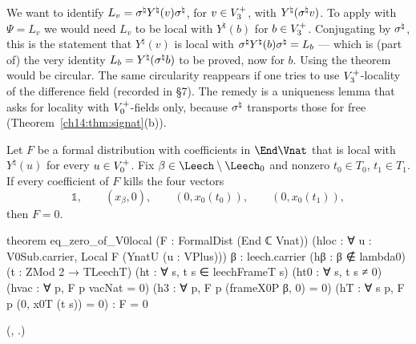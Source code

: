 \begin{warning}[title={Trap / dead end: The circularity of \lean{YnatT_eq_of_creates} in this context}]
We want to identify $L_v=\sigma^{\natural} Y^\natural(v)\sigma^{\natural}$, for $v\in V_3^{+}$, with
$Y^\natural(\sigma^{\natural} v)$.  To apply  with $\Psi=L_v$ we would need $L_v$ to be
local with $Y^\natural(b)$ for $b\in V_3^{+}$.  Conjugating by $\sigma^{\natural}$, this is the statement that
$Y^\natural(v)$ is local with $\sigma^{\natural} Y^\natural(b)\sigma^{\natural}=L_b$ — which is (part of) the very
identity $L_b=Y^\natural(\sigma^{\natural} b)$ to be proved, now for $b$.  Using the theorem would be circular.
The same circularity reappears if one tries to use $V_3^{+}$-locality of the difference field
(recorded in  \S7).  The remedy is a uniqueness lemma that asks for
locality with $V_0^{+}$-fields only, because $\sigma^{\natural}$ transports those for free
(Theorem~\ref{ch14:thm:signat}(b)).
\end{warning}

\begin{theorem}\label{ch14:thm:V0local}
Let $F$ be a formal distribution with coefficients in $\End\Vnat$ that is local with
$Y^\natural(u)$ for every $u\in V_0^{+}$.  Fix $\beta\in\Leech\setminus\Leech_0$ and nonzero
$t_0\in T_0$, $t_1\in T_1$.  If every coefficient of $F$ kills the four vectors
\begin{equation*}
  \mathbb 1,\qquad (x_\beta,0),\qquad (0,x_0(t_0)),\qquad (0,x_0(t_1)),
\end{equation*}
then $F=0$.
\end{theorem}
\begin{leancode}
theorem eq_zero_of_V0local (F : FormalDist (End ℂ Vnat))
    (hloc : ∀ u : V0Sub.carrier, Local F (YnatU (u : VPlus)))
    {β : leech.carrier} (hβ : β ∉ lambda0) (t : ZMod 2 → TLeechT)
    (ht : ∀ s, t s ∈ leechFrameT s) (ht0 : ∀ s, t s ≠ 0)
    (hvac : ∀ p, F p vacNat = 0) (h3 : ∀ p, F p (frameX0P β, 0) = 0)
    (hT : ∀ s p, F p (0, x0T (t s)) = 0) : F = 0
\end{leancode}
(, .)

